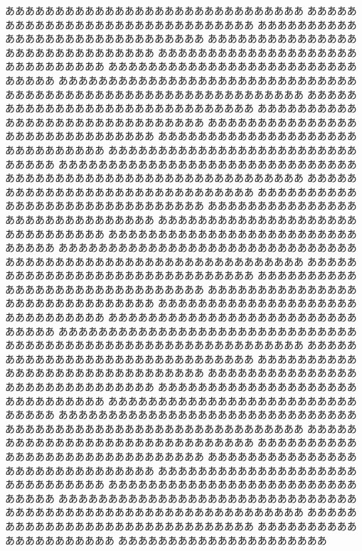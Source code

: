 ああああああああああああああああああああああああああああああ
ああああああああああああああああああああああああああああああ
ああああああああああああああああああああああああああああああ
ああああああああああああああああああああああああああああああ
ああああああああああああああああああああああああああああああ
ああああああああああああああああああああああああああああああ
ああああああああああああああああああああああああああああああ
ああああああああああああああああああああああああああああああ
ああああああああああああああああああああああああああああああ
%
ああああああああああああああああああああああああああああああ
ああああああああああああああああああああああああああああああ
ああああああああああああああああああああああああああああああ
ああああああああああああああああああああああああああああああ
ああああああああああああああああああああああああああああああ
ああああああああああああああああああああああああああああああ
ああああああああああああああああああああああああああああああ
ああああああああああああああああああああああああああああああ
ああああああああああああああああああああああああああああああ
ああああああああああああああああああああああああああああああ
ああああああああああああああああああああああああああああああ
%
ああああああああああああああああああああああああああああああ
ああああああああああああああああああああああああああああああ
ああああああああああああああああああああああああああああああ
ああああああああああああああああああああああああああああああ
ああああああああああああああああああああああああああああああ
ああああああああああああああああああああああああああああああ
ああああああああああああああああああああああああああああああ
ああああああああああああああああああああああああああああああ
ああああああああああああああああああああああああああああああ
%
ああああああああああああああああああああああああああああああ
ああああああああああああああああああああああああああああああ
ああああああああああああああああああああああああああああああ
ああああああああああああああああああああああああああああああ
ああああああああああああああああああああああああああああああ
ああああああああああああああああああああああああああああああ
ああああああああああああああああああああああああああああああ
ああああああああああああああああああああああああああああああ
ああああああああああああああああああああああああああああああ
ああああああああああああああああああああああああああああああ
%
ああああああああああああああああああああああああああああああ
ああああああああああああああああああああああああああああああ
ああああああああああああああああああああああああああああああ
ああああああああああああああああああああああああああああああ
ああああああああああああああああああああああああああああああ
あああああああああああああああああああああ
あああああああああああああああああああああ
%

